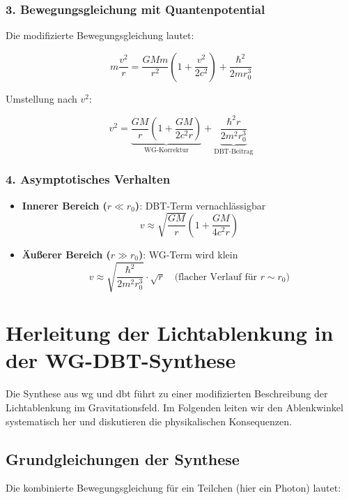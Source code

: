 \subsubsection{3. Bewegungsgleichung mit Quantenpotential}
Die modifizierte Bewegungsgleichung lautet:

\begin{equation}
m\frac{v^2}{r} = \frac{GMm}{r^2}\left(1 + \frac{v^2}{2c^2}\right) + \frac{\hbar^2}{2m r_0^3}
\end{equation}

Umstellung nach $v^2$:

\begin{equation}
    \boxed
    {
        v^2 = \underbrace{\frac{GM}{r}\left(1 + \frac{GM}{2c^2r}\right)}_{\text{WG-Korrektur}} + \underbrace{\frac{\hbar^2 r}{2m^2 r_0^3}}_{\text{DBT-Beitrag}}
    }
\end{equation}

\subsubsection{4. Asymptotisches Verhalten}
\begin{itemize}
\item \textbf{Innerer Bereich ($r \ll r_0$)}: DBT-Term vernachlässigbar
\begin{equation}
v \approx \sqrt{\frac{GM}{r}} \left(1 + \frac{GM}{4c^2r}\right)
\end{equation}

\item \textbf{Äußerer Bereich ($r \gg r_0$)}: WG-Term wird klein
\begin{equation}
v \approx \sqrt{\frac{\hbar^2}{2m^2 r_0^3}} \cdot \sqrt{r} \quad \text{(flacher Verlauf für $r \sim r_0$)}
\end{equation}
\end{itemize}

\section{Herleitung der Lichtablenkung in der WG-DBT-Synthese}
\label{sec:lichtablenkung}

Die Synthese aus \gls{wg} und \gls{dbt} führt zu einer modifizierten Beschreibung der Lichtablenkung im Gravitationsfeld. Im Folgenden leiten wir den Ablenkwinkel systematisch her
und diskutieren die physikalischen Konsequenzen.

\subsection{Grundgleichungen der Synthese}
Die kombinierte Bewegungsgleichung für ein Teilchen (hier ein Photon) lautet:

